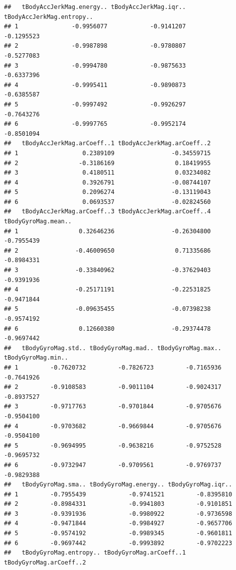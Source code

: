 \documentclass[
]{article}
\begin{document}
\begin{verbatim}
##   tBodyAccJerkMag.energy.. tBodyAccJerkMag.iqr.. tBodyAccJerkMag.entropy..
## 1               -0.9956077            -0.9141207                -0.1295523
## 2               -0.9987898            -0.9780807                -0.5277083
## 3               -0.9994780            -0.9875633                -0.6337396
## 4               -0.9995411            -0.9890873                -0.6385587
## 5               -0.9997492            -0.9926297                -0.7643276
## 6               -0.9997765            -0.9952174                -0.8501094
##   tBodyAccJerkMag.arCoeff..1 tBodyAccJerkMag.arCoeff..2
## 1                  0.2389109                -0.34559715
## 2                 -0.3186169                 0.18419955
## 3                  0.4180511                 0.03234082
## 4                  0.3926791                -0.08744107
## 5                  0.2096274                -0.13119043
## 6                  0.0693537                -0.02824560
##   tBodyAccJerkMag.arCoeff..3 tBodyAccJerkMag.arCoeff..4 tBodyGyroMag.mean..
## 1                 0.32646236                -0.26304800          -0.7955439
## 2                -0.46009650                 0.71335686          -0.8984331
## 3                -0.33840962                -0.37629403          -0.9391936
## 4                -0.25171191                -0.22531825          -0.9471844
## 5                -0.09635455                -0.07398238          -0.9574192
## 6                 0.12660380                -0.29374478          -0.9697442
##   tBodyGyroMag.std.. tBodyGyroMag.mad.. tBodyGyroMag.max.. tBodyGyroMag.min..
## 1         -0.7620732         -0.7826723         -0.7165936         -0.7641926
## 2         -0.9108583         -0.9011104         -0.9024317         -0.8937527
## 3         -0.9717763         -0.9701844         -0.9705676         -0.9504100
## 4         -0.9703682         -0.9669844         -0.9705676         -0.9504100
## 5         -0.9694995         -0.9638216         -0.9752528         -0.9695732
## 6         -0.9732947         -0.9709561         -0.9769737         -0.9829388
##   tBodyGyroMag.sma.. tBodyGyroMag.energy.. tBodyGyroMag.iqr..
## 1         -0.7955439            -0.9741521         -0.8395810
## 2         -0.8984331            -0.9941803         -0.9101851
## 3         -0.9391936            -0.9980922         -0.9736598
## 4         -0.9471844            -0.9984927         -0.9657706
## 5         -0.9574192            -0.9989345         -0.9601811
## 6         -0.9697442            -0.9993892         -0.9702223
##   tBodyGyroMag.entropy.. tBodyGyroMag.arCoeff..1 tBodyGyroMag.arCoeff..2

\end{verbatim}
\end{document}
